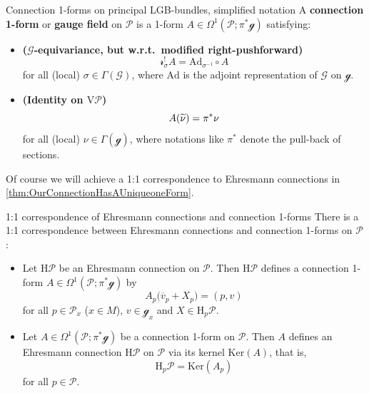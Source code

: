 \documentclass[reqno,a4paper,oneside]{amsart}
\theoremstyle{plain}
\theoremstyle{remark}
\theoremstyle{definition}
\begin{document}

\begin{definitions*}{Connection 1-forms on principal LGB-bundles, simplified notation}
A \textbf{connection 1-form} or \textbf{gauge field} on $\mathcal{P}$ is a 1-form $A \in \Omega^1(\mathcal{P}; \pi^*\mathcal{g})$ satisfying:
\begin{itemize}
	\item \textbf{($\mathcal{G}$-equivariance, but w.r.t.\ modified right-pushforward)}
		\begin{equation*} 
			\mathcal{r}_\sigma^! A
			=
			\mathrm{Ad}_{\sigma^{-1}} \circ A
		\end{equation*}
	for all (local) $\sigma \in \Gamma(\mathcal{G})$, where $\mathrm{Ad}$ is the adjoint representation of $\mathcal{G}$ on $\mathcal{g}$.
	\item \textbf{(Identity on $\mathrm{V}\mathcal{P}$)}
	\begin{equation*}
	A\mleft(\widetilde{\nu}\mright)
	=
	\pi^*\nu
	\end{equation*}
	for all (local) $\nu \in \Gamma(\mathcal{g})$, where notations like $\pi^*$ denote the pull-back of sections.
\end{itemize}
\end{definitions*}

Of course we will achieve a 1:1 correspondence to Ehresmann connections in \ref{thm:OurConnectionHasAUniqueoneForm}.

\begin{theorems*}{1:1 correspondence of Ehresmann connections and connection 1-forms}
There is a 1:1 correspondence between Ehresmann connections and connection 1-forms on $\mathcal{P}$:
\begin{itemize}
	\item Let $\mathrm{H}\mathcal{P}$ be an Ehresmann connection on $\mathcal{P}$. Then $\mathrm{H}\mathcal{P}$ defines a connection 1-form $A \in \Omega^1(\mathcal{P}; \pi^*\mathcal{g})$ by
	\begin{equation*}
	A_p\bigl( \overline{v}_p + X_p \bigr)
	=
	(p, v)
	\end{equation*}
	for all $p \in \mathcal{P}_x$ ($x \in M$), $v \in \mathcal{g}_x$ and $X \in \mathrm{H}_p\mathcal{P}$.
	\item Let $A \in \Omega^1(\mathcal{P}; \pi^*\mathcal{g})$ be a connection 1-form on $\mathcal{P}$. Then $A$ defines an Ehresmann connection $\mathrm{H}\mathcal{P}$ on $\mathcal{P}$ via its kernel $\mathrm{Ker}(A)$, that is,
	\begin{equation*}
	\mathrm{H}_p\mathcal{P}
	=
	\mathrm{Ker}(A_p)
	\end{equation*}
	for all $p \in \mathcal{P}$.
\end{itemize}
\end{theorems*}
\end{document}

